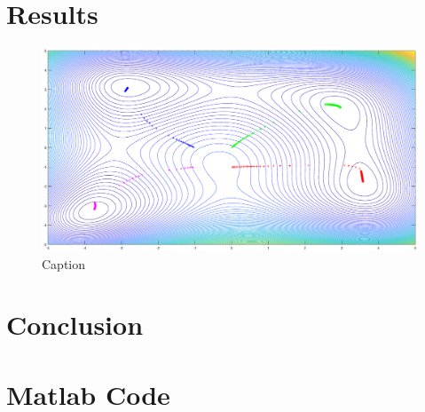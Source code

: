 \documentclass[12pt]{article}
\begin{document}
\section{Results}
\begin{figure}
    \centering
    \includegraphics[width=1\textwidth]{SDM_Contour.eps}
    \caption{Caption}
    \label{fig:my_label}
\end{figure}
\section{Conclusion}

\pagebreak

\appendix
\section{Matlab Code}

\end{document}
